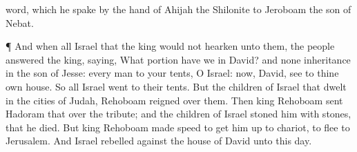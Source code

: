 {word, which he
spake by the
hand of
Ahijah the
Shilonite to
Jeroboam the
son of
Nebat.
\par }{\PP {}¶ And when all
Israel
{} that the
king would not
hearken unto them, the
people
answered the
king,
saying, What
portion have we in
David? and
{} none
inheritance in the
son of
Jesse: every
man to your
tents, O
Israel:
{} now,
David,
see to thine own
house. So all
Israel
went to their
tents.
But
{} the
children of
Israel that
dwelt in the
cities of
Judah,
Rehoboam
reigned over them.
Then
king
Rehoboam
sent
Hadoram that
{} over the
tribute; and the
children of
Israel
stoned him with
stones, that he
died. But
king
Rehoboam made
speed to get him
up to
{}
chariot, to
flee to
Jerusalem.
And
Israel
rebelled against the
house of
David unto this
day.

}

